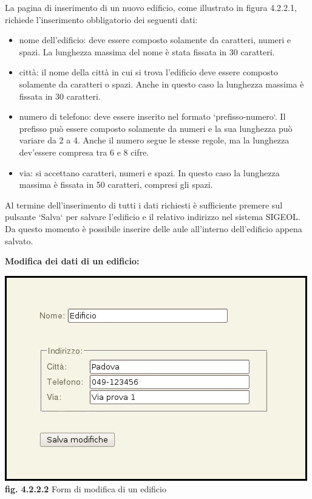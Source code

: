 \documentclass[11pt,a4paper]{article}
\begin{document}
La pagina di inserimento di un nuovo edificio, come illustrato in figura 4.2.2.1, richiede l'inserimento obbligatorio dei seguenti dati:
\begin{itemize}
 \item nome dell'edificio: deve essere composto solamente da caratteri, numeri e spazi. La lunghezza massima del nome è stata fissata in 30 caratteri.
 \item città: il nome della città in cui si trova l'edificio deve essere composto solamente da caratteri o spazi. Anche in questo caso la lunghezza massima è fissata in 30 caratteri.
 \item numero di telefono: deve essere inserito nel formato `prefisso-numero`. Il prefisso può essere composto solamente da numeri e la sua lunghezza può variare da 2 a 4. Anche il numero segue le stesse regole, ma la lunghezza dev'essere compresa tra 6 e 8 cifre.
 \item via: si accettano caratteri, numeri e spazi. In questo caso la lunghezza massima è fissata in 50 caratteri, compresi gli spazi.
\end{itemize}
Al termine dell'inserimento di tutti i dati richiesti è sufficiente premere sul pulsante `Salva` per salvare l'edificio e il relativo indirizzo nel sistema SIGEOL.
Da questo momento è possibile inserire delle aule all'interno dell'edificio appena salvato.
\newpage
\begin{large}\textbf{Modifica dei dati di un edificio:}\end{large}

\begin{center}
	\includegraphics[scale=0.5]{images/modifica_edificio.jpg}\\
	\textbf{fig. 4.2.2.2} Form di modifica di un edificio\\
\end{center}
\end{document}
